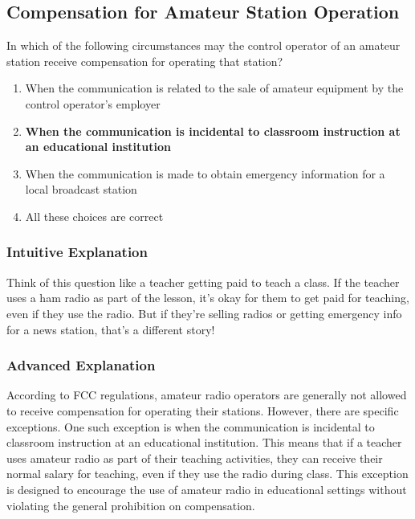 \subsection{Compensation for Amateur Station Operation}
\label{T1D08}

\begin{tcolorbox}[colback=gray!10!white,colframe=black!75!black,title=T1D08]
In which of the following circumstances may the control operator of an amateur station receive compensation for operating that station?
\begin{enumerate}[label=\Alph*),noitemsep]
    \item When the communication is related to the sale of amateur equipment by the control operator's employer
    \item \textbf{When the communication is incidental to classroom instruction at an educational institution}
    \item When the communication is made to obtain emergency information for a local broadcast station
    \item All these choices are correct
\end{enumerate}
\end{tcolorbox}

\subsubsection{Intuitive Explanation}
Think of this question like a teacher getting paid to teach a class. If the teacher uses a ham radio as part of the lesson, it's okay for them to get paid for teaching, even if they use the radio. But if they're selling radios or getting emergency info for a news station, that's a different story!

\subsubsection{Advanced Explanation}
According to FCC regulations, amateur radio operators are generally not allowed to receive compensation for operating their stations. However, there are specific exceptions. One such exception is when the communication is incidental to classroom instruction at an educational institution. This means that if a teacher uses amateur radio as part of their teaching activities, they can receive their normal salary for teaching, even if they use the radio during class. This exception is designed to encourage the use of amateur radio in educational settings without violating the general prohibition on compensation.